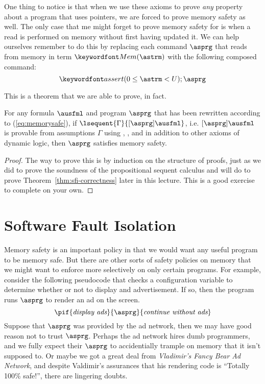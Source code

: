 \documentclass[11pt,twoside]{scrartcl}
\begin{document}
One thing to notice is that when we use these axioms to prove \emph{any} property about a program that uses pointers, we are forced to prove memory safety as well. The only case that me might forget to prove memory safety for is when a read is performed on memory without first having updated it. We can help ourselves remember to do this by replacing each command $\asprg$ that reads from memory in term $\pderef{\astrm}$ with the following composed command:
\begin{equation}
\label{eq:memorysafe}
\passert{0 \le \astrm < \maxmem};\asprg
\end{equation}

This is a theorem that we are able to prove, in fact.
\begin{theorem}
For any formula $\ausfml$ and program $\asprg$ that has been rewritten according to (\ref{eq:memorysafe}), if $\lsequent{\Gamma}{\dibox{\asprg}{\ausfml}}$, i.e. $\dibox{\asprg}{\ausfml}$ is provable from assumptions $\Gamma$ using , , and  in addition to other axioms of dynamic logic, then $\asprg$ satisfies memory safety.
\end{theorem}
\begin{proof}
The way to prove this is by induction on the structure of proofs, just as we did to prove the soundness of the propositional sequent calculus and will do to prove Theorem~\ref{thm:sfi-correctness} later in this lecture. This is a good exercise to complete on your own.
\end{proof}

\section{Software Fault Isolation}
Memory safety is an important policy in that we would want any useful program to be memory safe. But there are other sorts of safety policies on memory that we might want to enforce more selectively on only certain programs. For example, consider the following pseudocode that checks a configuration variable to determine whether or not to display and advertisement. If so, then the program runs $\asprg$ to render an ad on the screen.
\[
\pif{\textit{display ads}}{\asprg}{\textit{continue without ads}}
\]
Suppose that $\asprg$ was provided by the ad network, then we may have good reason not to trust $\asprg$. Perhaps the ad network hires dumb programmers, and we fully expect their $\asprg$ to accidentially trample on memory that it isn't supposed to. Or maybe we got a great deal from \emph{Vladimir's Fancy Bear Ad Network}, and despite Valdimir's assurances that his rendering code is ``Totally 100\% safe!'', there are lingering doubts. 
\end{document}
